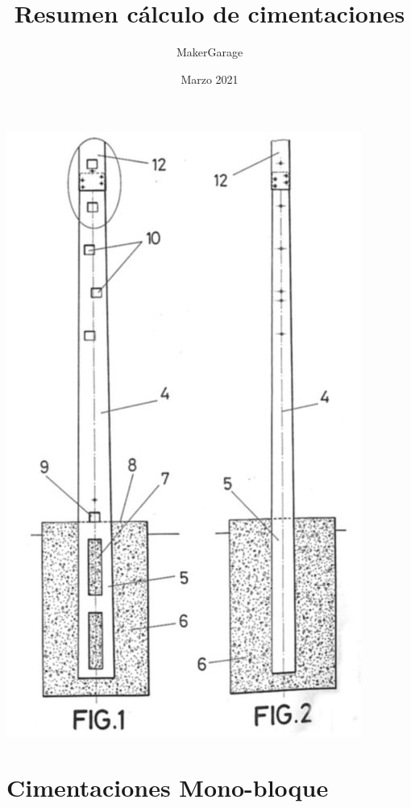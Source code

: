 \documentclass{article}
\title{Resumen cálculo de cimentaciones}
\author{MakerGarage}
\date{Marzo 2021}
\begin{document}
\maketitle
\begin{center}
\includegraphics[trim={0 10 cm 0 0},scale = 2,clip]{assets/img/Portada.jpg}
\end{center}
\newpage
\tableofcontents
\newpage

\section{Cimentaciones Mono-bloque}
\end{document}
